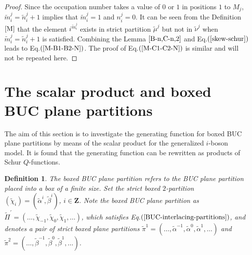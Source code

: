 \documentclass[11pt,reqno]{amsart}
\numberwithin{equation}{section}
\newtheorem{definition}[theorem]{Definition}
\begin{document}
	\begin{proof}
		Since the occupation number takes a value of $0$ or $1$ in positions $1$ to
		$M_j$,  $\tilde{m}_i^{j}= \tilde{n}_i^{j} + 1$
		implies that $\tilde{m}_i^{j}= 1$ and $n_i^{j} = 0$.
		It can be seen from the Definition $\ref{M}$ that
		the element $i^{\tilde{m}_i^{j}}$  exists in strict partition $\tilde{\mu}^{j}$ but not in $\tilde{\nu}^{j}$ when  $\tilde{m}_i^{j}= \tilde{n}_i^{j} + 1$  is satisfied.
		Combining the Lemma $\ref{B-n,C-n,2}$ and Eq.$(\ref{skew-schur})$
		leads to Eq.$(\ref{M-B1-B2-N})$.
		The proof of Eq.$(\ref{M-C1-C2-N})$  is similar and will not be repeated here.
	\end{proof}
	
	
	
	
	\section{The scalar product and boxed BUC plane partitions}
	The aim of this section is
	to investigate the  generating function for boxed BUC plane partitions by means of the scalar product for the   generalized $i$-boson model.
	It is found that the generating function can be rewritten as  products of   Schur $Q$-functions.
	
	
	
	
	\begin{definition}
		The boxed BUC plane partition refers to the BUC plane partition placed into a box of a finite size.
		Set the   strict boxed   $2$-partition $(\tilde{\chi}_{i})=(\tilde{\alpha}^i,\tilde{\beta}^i)$, $i\in\mathbf{Z}$.	 Note the boxed BUC plane partition as $\tilde{\Pi}^{'}=(\ldots,\tilde{\chi}_{-1},\tilde{\chi}_{0},\tilde{\chi}_{1},\ldots)$, which  satisfies Eq.$(\ref{BUC-interlacing-partitions})$,
		and  denotes a pair of strict boxed  plane partitions
		$\tilde{\pi}^{1}=(\ldots,\tilde{\alpha}^{-1},\tilde{\alpha}^{0},\tilde{\alpha}^{1},\ldots)$ and $\tilde{\pi}^{2}=(\ldots,\tilde{\beta}^{-1},\tilde{\beta}^{0},\tilde{\beta}^{1},\ldots)$.
	\end{definition}
	
\end{document}
